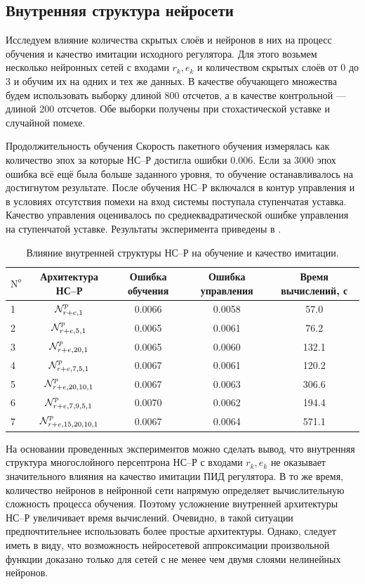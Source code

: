 \subsection{Внутренняя структура нейросети}

Исследуем влияние количества скрытых слоёв и нейронов в них на
процесс обучения и качество имитации исходного регулятора.  Для этого
возьмем несколько нейронных сетей с входами $r_k,e_k$ и количеством
скрытых слоёв от 0 до 3 и обучим их на одних и тех же данных.  В
качестве обучающего множества будем использовать выборку длиной 800
отсчетов, а в качестве контрольной --- длиной 200 отсчетов.  Обе
выборки получены при стохастической уставке и случайной помехе.

Продолжительность обучения Скорость пакетного обучения измерялась как количество эпох за которые
НС--Р достигла ошибки 0.006.  Если за 3000 эпох ошибка всё ещё была
больше заданного уровня, то обучение останавливалось на достигнутом
результате.  После обучения НС--Р включался в контур управления и в
условиях отсутствия помехи на вход системы поступала ступенчатая
уставка.  Качество управления оценивалось по среднеквадратической
ошибке управления на ступенчатой уставке.  Результаты эксперимента
приведены в .

\begin{table}
\caption{Влияние внутренней структуры НС--Р на обучение и качество имитации.}\label{tabl:nnp_internal_arch}
\begin{tabular}{|l|c|c|c|c|}
\hline
$\mathrm{N}^o$ & Архитектура НС--Р & Ошибка обучения & Ошибка управления & Время вычислений, с\\
\hline
1 & $\mathcal{N}^p_{r+e,1}$          & 0.0066& 0.0058 & 57.0\\
2 & $\mathcal{N}^p_{r+e,5,1}$        & 0.0065& 0.0061 & 76.2\\
3 & $\mathcal{N}^p_{r+e,20,1}$       & 0.0065& 0.0060 & 132.1\\
4 & $\mathcal{N}^p_{r+e,7,5,1}$      & 0.0067& 0.0061 & 120.2\\
5 & $\mathcal{N}^p_{r+e,20,10,1}$    & 0.0067& 0.0063 & 306.6\\
6 & $\mathcal{N}^p_{r+e,7,9,5,1}$    & 0.0070& 0.0062 & 194.4\\
7 & $\mathcal{N}^p_{r+e,15,20,10,1}$ & 0.0067& 0.0064 & 571.1\\
\hline
\end{tabular}
\end{table}

На основании проведенных экспериментов можно сделать вывод, что
внутренняя структура многослойного персептрона НС--Р с входами
$r_k,e_k$ не оказывает значительного влияния на качество имитации ПИД
регулятора.  В то же время, количество нейронов в нейронной сети
напрямую определяет вычислительную сложность процесса обучения.
Поэтому усложнение внутренней архитектуры НС--Р увеличивает время
вычислений.  Очевидно, в такой ситуации предпочтительнее использовать
более простые архитектуры.  Однако, следует иметь в виду, что
возможность нейросетевой аппроксимации произвольной функции доказано
только для сетей с не менее чем двумя слоями нелинейных нейронов.

